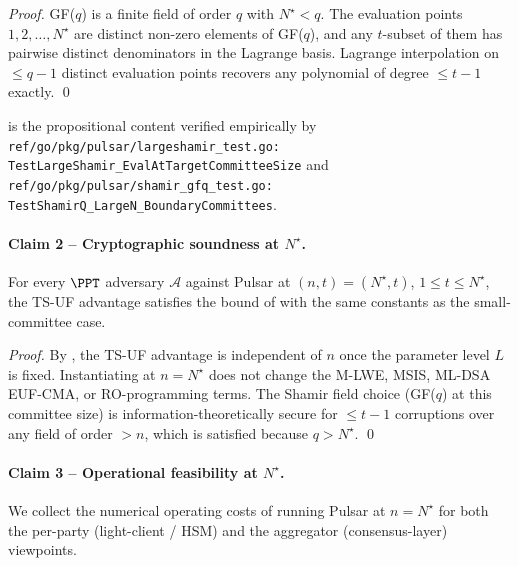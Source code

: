 \begin{proof}
GF($q$) is a finite field of order $q$ with $N^\star < q$. The
evaluation points $1, 2, \dots, N^\star$ are distinct non-zero
elements of GF($q$), and any $t$-subset of them has pairwise
distinct denominators in the Lagrange basis. Lagrange interpolation
on $\le q - 1$ distinct evaluation points recovers any polynomial of
degree $\le t - 1$ exactly. \qed
\end{proof}

 is the propositional content
verified empirically by
\texttt{ref/go/pkg/pulsar/largeshamir\_test.go:\\TestLargeShamir\_EvalAtTargetCommitteeSize}
and
\texttt{ref/go/pkg/pulsar/shamir\_gfq\_test.go:\\TestShamirQ\_LargeN\_BoundaryCommittees}.

\paragraph{Claim 2 -- Cryptographic soundness at $N^\star$.}

\begin{theorem}
\label{thm:pulsar-soundness-at-N-star}
For every $\PPT$ adversary $\mathcal{A}$ against Pulsar at
$(n, t) = (N^\star, t)$, $1 \le t \le N^\star$, the TS-UF advantage
satisfies the bound of  with the same
constants as the small-committee case.
\end{theorem}

\begin{proof}
By , the TS-UF advantage is independent
of $n$ once the parameter level $L$ is fixed. Instantiating at
$n = N^\star$ does not change the M-LWE, MSIS, ML-DSA EUF-CMA, or
RO-programming terms. The Shamir field choice (GF($q$) at this
committee size) is information-theoretically secure for $\le t-1$
corruptions over any field of order $> n$, which is satisfied
because $q > N^\star$. \qed
\end{proof}

\paragraph{Claim 3 -- Operational feasibility at $N^\star$.}

We collect the numerical operating costs of running Pulsar at
$n = N^\star$ for both the per-party (light-client / HSM) and the
aggregator (consensus-layer) viewpoints.

